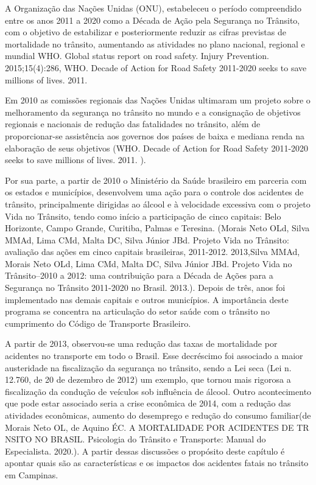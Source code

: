 A Organização das Nações Unidas (ONU), estabeleceu o período compreendido entre os anos 2011 a 2020 como a Década de Ação pela Segurança no Trânsito, com o objetivo de estabilizar e posteriormente reduzir as cifras previstas de mortalidade no trânsito, aumentando as atividades no plano nacional, regional e mundial WHO. Global status report on road safety. Injury Prevention. 2015;15(4):286, WHO. Decade of Action for Road Safety 2011-2020 seeks to save millions of lives. 2011. 

Em 2010 as comissões regionais das Nações Unidas ultimaram um projeto sobre o melhoramento da segurança no trânsito no mundo e a consignação de objetivos regionais e nacionais de redução das fatalidades no trânsito, além de proporcionar-se assistência aos governos dos países de baixa e mediana renda na elaboração de seus objetivos (WHO. Decade of Action for Road Safety 2011-2020 seeks to save millions of lives. 2011. ).

Por sua parte, a partir de 2010 o Ministério da Saúde brasileiro em parceria com os estados e municípios, desenvolvem uma ação para o controle dos acidentes de trânsito, principalmente dirigidas ao álcool e à velocidade excessiva com o projeto Vida no Trânsito, tendo como início a participação de cinco capitais: Belo Horizonte, Campo Grande, Curitiba, Palmas e Teresina. (Morais Neto OLd, Silva MMAd, Lima CMd, Malta DC, Silva Júnior JBd. Projeto Vida no Trânsito: avaliação das ações em cinco capitais brasileiras, 2011-2012. 2013,Silva MMAd, Morais Neto OLd, Lima CMd, Malta DC, Silva Júnior JBd. Projeto Vida no Trânsito–2010 a 2012: uma contribuição para a Década de Ações para a Segurança no Trânsito 2011-2020 no Brasil. 2013.). Depois de três, anos foi implementado nas demais capitais e outros municípios.  A importância deste programa se concentra na articulação do setor saúde com o trânsito no cumprimento do Código de Transporte Brasileiro.

A partir de 2013, observou-se uma redução das taxas de mortalidade por acidentes no transporte em todo o Brasil. Esse decréscimo foi associado a maior austeridade na fiscalização da segurança no trânsito, sendo  a Lei seca (Lei n. 12.760, de 20 de dezembro de 2012) um exemplo, que tornou mais rigorosa a fiscalização da condução de veículos sob influência de álcool. Outro acontecimento que pode estar associado seria a crise econômica de 2014, com a redução das atividades econômicas, aumento do desemprego e redução do consumo familiar(de Morais Neto OL, de Aquino ÉC. A MORTALIDADE POR ACIDENTES DE TR NSITO NO BRASIL. Psicologia do Trânsito e Transporte: Manual do Especialista. 2020.).
A partir dessas discussões o propósito deste capítulo é apontar quais são as características e os impactos dos acidentes fatais no trânsito em Campinas.


